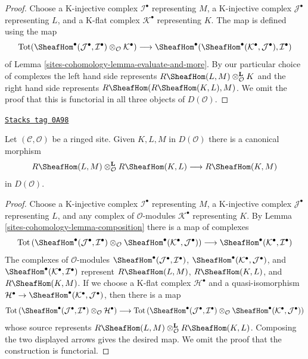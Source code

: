 \begin{proof}
Choose
a K-injective complex $\mathcal{I}^\bullet$ representing $M$,
a K-injective complex $\mathcal{J}^\bullet$ representing $L$, and
a K-flat complex $\mathcal{K}^\bullet$ representing $K$.
The map is defined using the map
$$
\text{Tot}(\SheafHom^\bullet(\mathcal{J}^\bullet,
\mathcal{I}^\bullet) \otimes_\mathcal{O} \mathcal{K}^\bullet)
\longrightarrow
\SheafHom^\bullet(\SheafHom^\bullet(\mathcal{K}^\bullet,
\mathcal{J}^\bullet), \mathcal{I}^\bullet)
$$
of Lemma \ref{sites-cohomology-lemma-evaluate-and-more}. By our particular
choice of complexes the left hand side represents
$R\SheafHom(L, M) \otimes_\mathcal{O}^\mathbf{L} K$
and the right hand side represents
$R\SheafHom(R\SheafHom(K, L), M)$. We omit the proof that
this is functorial in all three objects of $D(\mathcal{O})$.
\end{proof}

\begin{lemma}
\label{sites-cohomology-lemma-internal-hom-composition}
\href{https://stacks.math.columbia.edu/tag/0A98}{\texttt{Stacks tag 0A98}}


Let $(\mathcal{C}, \mathcal{O})$ be a ringed site. Given $K, L, M$ in
$D(\mathcal{O})$ there is a canonical morphism
$$
R\SheafHom(L, M) \otimes_\mathcal{O}^\mathbf{L} R\SheafHom(K, L)
\longrightarrow R\SheafHom(K, M)
$$
in $D(\mathcal{O})$.
\end{lemma}

\begin{proof}
Choose a K-injective complex $\mathcal{I}^\bullet$ representing $M$,
a K-injective complex $\mathcal{J}^\bullet$ representing $L$, and
any complex of $\mathcal{O}$-modules $\mathcal{K}^\bullet$ representing $K$.
By Lemma \ref{sites-cohomology-lemma-composition} there is a map of complexes
$$
\text{Tot}\left(
\SheafHom^\bullet(\mathcal{J}^\bullet, \mathcal{I}^\bullet)
\otimes_\mathcal{O}
\SheafHom^\bullet(\mathcal{K}^\bullet, \mathcal{J}^\bullet)
\right)
\longrightarrow
\SheafHom^\bullet(\mathcal{K}^\bullet, \mathcal{I}^\bullet)
$$
The complexes of $\mathcal{O}$-modules
$\SheafHom^\bullet(\mathcal{J}^\bullet, \mathcal{I}^\bullet)$,
$\SheafHom^\bullet(\mathcal{K}^\bullet, \mathcal{J}^\bullet)$, and
$\SheafHom^\bullet(\mathcal{K}^\bullet, \mathcal{I}^\bullet)$
represent $R\SheafHom(L, M)$, $R\SheafHom(K, L)$, and $R\SheafHom(K, M)$.
If we choose a K-flat complex $\mathcal{H}^\bullet$ and a quasi-isomorphism
$\mathcal{H}^\bullet \to
\SheafHom^\bullet(\mathcal{K}^\bullet, \mathcal{J}^\bullet)$,
then there is a map
$$
\text{Tot}\left(
\SheafHom^\bullet(\mathcal{J}^\bullet, \mathcal{I}^\bullet)
\otimes_\mathcal{O} \mathcal{H}^\bullet
\right)
\longrightarrow
\text{Tot}\left(
\SheafHom^\bullet(\mathcal{J}^\bullet, \mathcal{I}^\bullet)
\otimes_\mathcal{O}
\SheafHom^\bullet(\mathcal{K}^\bullet, \mathcal{J}^\bullet)
\right)
$$
whose source represents
$R\SheafHom(L, M) \otimes_\mathcal{O}^\mathbf{L} R\SheafHom(K, L)$.
Composing the two displayed arrows gives the desired map. We omit the
proof that the construction is functorial.
\end{proof}

